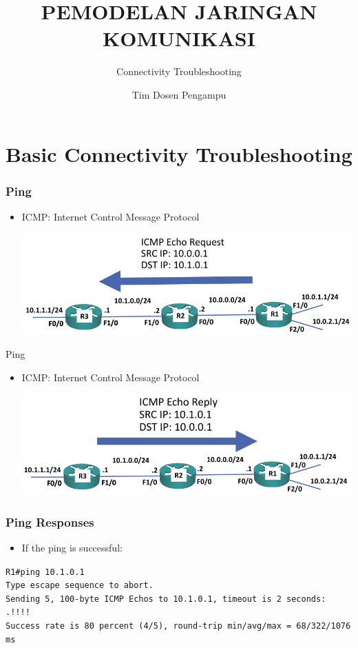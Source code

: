 \documentclass[pdflatex,compress,mathserif]{beamer}
\title{PEMODELAN JARINGAN KOMUNIKASI}
\subtitle{Connectivity Troubleshooting}
\author{Tim Dosen Pengampu}
\begin{document}
\maketitle

\section{Basic Connectivity Troubleshooting}

\begin{frame}
	\frametitle{Ping}
	\begin{itemize}
		\item ICMP: Internet Control Message Protocol
		\begin{center}
			\includegraphics[width=\linewidth]{img/img01}
		\end{center}
	\end{itemize}
\end{frame}

\begin{frame}{Ping}
	\begin{itemize}
		\item ICMP: Internet Control Message Protocol
		\begin{center}
			\includegraphics[width=\linewidth]{img/img02}
		\end{center}
	\end{itemize}
\end{frame}

\begin{frame}
	\frametitle{Ping Responses}
	\begin{itemize}
		\item If the ping is successful:
	\end{itemize}
	\texttt{R1\#ping 10.1.0.1
\\
		Type escape sequence to abort.
\\
		Sending 5, 100-byte ICMP Echos to 10.1.0.1, timeout is 2
 seconds:
\\
		.!!!!
\\
		Success rate is 80 percent (4/5), round-trip min/avg/max =
68/322/1076 ms} \\
\end{frame}
\end{document}
